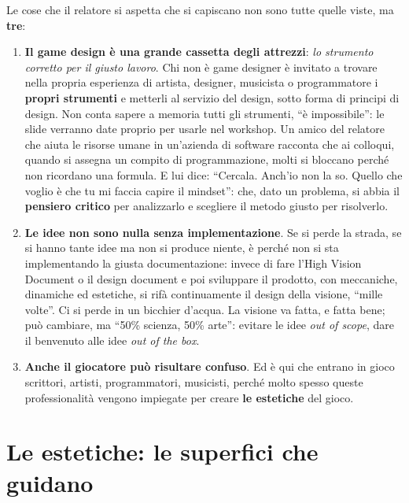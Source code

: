 Le cose che il relatore si aspetta che si capiscano non sono tutte quelle viste,
ma \textbf{tre}:
\begin{enumerate}
  \item \textbf{Il game design è una grande cassetta degli attrezzi}:
        \emph{lo strumento corretto per il giusto lavoro}. Chi non è game
        designer è invitato a trovare nella propria esperienza di artista,
        designer, musicista o programmatore i \textbf{propri strumenti} e
        metterli al servizio del design, sotto forma di principi di design.
        Non conta sapere a memoria tutti gli strumenti, ``è impossibile'':
        le slide verranno date proprio per usarle nel workshop. Un amico del
        relatore che aiuta le risorse umane in un'azienda di software racconta
        che ai colloqui, quando si assegna un compito di programmazione, molti
        si bloccano perché non ricordano una formula. E lui dice: ``Cercala.
        Anch'io non la so. Quello che voglio è che tu mi faccia capire il
        mindset'': che, dato un problema, si abbia il \textbf{pensiero critico}
        per analizzarlo e scegliere il metodo giusto per risolverlo.
  \item \textbf{Le idee non sono nulla senza implementazione}. Se si
        perde la strada, se si hanno tante idee ma non si produce niente, è
        perché non si sta implementando la giusta documentazione: invece di fare
        l'High Vision Document o il design document e poi sviluppare il
        prodotto, con meccaniche, dinamiche ed estetiche, si rifà continuamente
        il design della visione, ``mille volte''. Ci si perde in un bicchier
        d'acqua. La visione va fatta, e fatta bene; può cambiare, ma ``50\%
        scienza, 50\% arte'': evitare le idee \emph{out of scope}, dare il
        benvenuto alle idee \emph{out of the box}.
  \item \textbf{Anche il giocatore può risultare confuso}. Ed è qui che
        entrano in gioco scrittori, artisti, programmatori, musicisti, perché
        molto spesso queste professionalità vengono impiegate per creare
        \textbf{le estetiche} del gioco.
\end{enumerate}

\section{Le estetiche: le superfici che guidano}
\label{sec:z6-estetiche}

